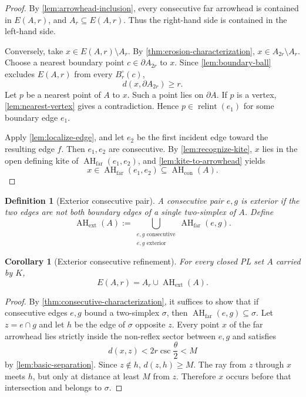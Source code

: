\documentclass[11pt]{article}
\newtheorem{corollary}[theorem]{Corollary}
\newtheorem{definition}[theorem]{Definition}
\newcommand{\relint}{\operatorname{relint}}
\newcommand{\AHcon}{\operatorname{AH}_{\mathrm{con}}}
\newcommand{\AHext}{\operatorname{AH}_{\mathrm{ext}}}
\newcommand{\AHfar}{\operatorname{AH}_{\mathrm{far}}}
\numberwithin{equation}{section}
\begin{document}
\begin{proof}
By \cref{lem:arrowhead-inclusion}, every consecutive far arrowhead is contained in $E(A,r)$, and $A_r\subseteq E(A,r)$. Thus the right-hand side is contained in the left-hand side.

Conversely, take $x\in E(A,r)\setminus A_r$. By \cref{thm:erosion-characterization}, $x\in A_{2r}\setminus A_r$. Choose a nearest boundary point $c\in\partial A_{2r}$ to $x$. Since \cref{lem:boundary-ball} excludes $E(A,r)$ from every $B_r^\circ(c)$,
\[
d(x,\partial A_{2r})\ge r.
\]
Let $p$ be a nearest point of $A$ to $x$. Such a point lies on $\partial A$. If $p$ is a vertex, \cref{lem:nearest-vertex} gives a contradiction. Hence $p\in\relint(e_1)$ for some boundary edge $e_1$.

Apply \cref{lem:localize-edge}, and let $e_2$ be the first incident edge toward the resulting edge $f$. Then $e_1,e_2$ are consecutive. By \cref{lem:recognize-kite}, $x$ lies in the open defining kite of $\AHfar(e_1,e_2)$, and \cref{lem:kite-to-arrowhead} yields
\[
x\in\AHfar(e_1,e_2)\subseteq\AHcon(A).
\]
\end{proof}

\begin{definition}[Exterior consecutive pair]\label{def:exterior}
A consecutive pair $e,g$ is \emph{exterior} if the two edges are not both boundary edges of a single two-simplex of $A$. Define
\[
\AHext(A)
:=
\bigcup_{\substack{e,g\text{ consecutive}\\e,g\text{ exterior}}}
\AHfar(e,g).
\]
\end{definition}

\begin{corollary}[Exterior consecutive refinement]\label{cor:exterior-characterization}
For every closed PL set $A$ carried by $K$,
\[
\boxed{E(A,r)=A_r\cup\AHext(A).}
\]
\end{corollary}

\begin{proof}
By \cref{thm:consecutive-characterization}, it suffices to show that if consecutive edges $e,g$ bound a two-simplex $\sigma$, then $\AHfar(e,g)\subseteq\sigma$. Let $z=e\cap g$ and let $h$ be the edge of $\sigma$ opposite $z$. Every point $x$ of the far arrowhead lies strictly inside the non-reflex sector between $e,g$ and satisfies
\[
d(x,z)<2r\csc\frac\theta2<M
\]
by \cref{lem:basic-separation}. Since $z\notin h$, $d(z,h)\ge M$. The ray from $z$ through $x$ meets $h$, but only at distance at least $M$ from $z$. Therefore $x$ occurs before that intersection and belongs to $\sigma$.
\end{proof}
\end{document}
